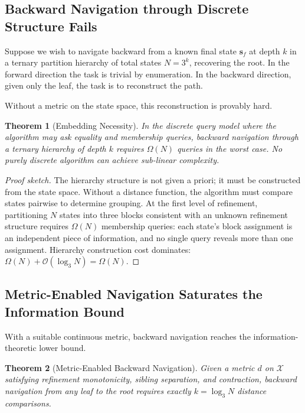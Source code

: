 \documentclass[twocolumn,11pt,a4paper]{article}
\newtheorem{theorem}{Theorem}[section]
\begin{document}
\subsection{Backward Navigation through Discrete Structure Fails}

Suppose we wish to navigate backward from a known final state $\mathbf{s}_f$ at depth $k$ in a ternary partition hierarchy of total states $N = 3^k$, recovering the root. In the forward direction the task is trivial by enumeration. In the backward direction, given only the leaf, the task is to reconstruct the path.

Without a metric on the state space, this reconstruction is provably hard.

\begin{theorem}[Embedding Necessity]
\label{thm:embedding_necessity}
In the discrete query model where the algorithm may ask equality and membership queries, backward navigation through a ternary hierarchy of depth $k$ requires $\Omega(N)$ queries in the worst case. No purely discrete algorithm can achieve sub-linear complexity.
\end{theorem}

\begin{proof}[Proof sketch]
The hierarchy structure is not given a priori; it must be constructed from the state space. Without a distance function, the algorithm must compare states pairwise to determine grouping. At the first level of refinement, partitioning $N$ states into three blocks consistent with an unknown refinement structure requires $\Omega(N)$ membership queries: each state's block assignment is an independent piece of information, and no single query reveals more than one assignment. Hierarchy construction cost dominates: $\Omega(N) + \mathcal{O}(\log_3 N) = \Omega(N)$.
\end{proof}

\subsection{Metric-Enabled Navigation Saturates the Information Bound}

With a suitable continuous metric, backward navigation reaches the information-theoretic lower bound.

\begin{theorem}[Metric-Enabled Backward Navigation]
Given a metric $d$ on $\mathcal{X}$ satisfying refinement monotonicity, sibling separation, and contraction, backward navigation from any leaf to the root requires exactly $k = \log_3 N$ distance comparisons.
\end{theorem}
\end{document}
